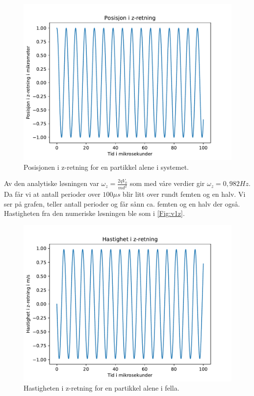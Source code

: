 \documentclass[reprint,english,notitlepage, nofootinbib]{revtex4-1}  %
\begin{document}
\begin{figure}[H]
	\centering 
	\includegraphics[scale=0.4]{../pythonplots/r1z.pdf}
	\caption{Posisjonen i z-retning for en partikkel alene i systemet.}
	\label{Fig:r1z}
\end{figure}
Av den analytiske løsningen var $\omega_z=\frac{2qV_0}{md^2}$ som med våre verdier gir $\omega_z=0,982Hz$. Da får vi at antall perioder over $100 \mu s$ blir litt over rundt femten og en halv. Vi ser på grafen, teller antall perioder og får sånn ca. femten og en halv der også.
Hastigheten fra den numeriske løsningen ble som i \autoref{Fig:v1z}.
\begin{figure}[H]
	\centering 
	\includegraphics[scale=0.4]{../pythonplots/vz.pdf}
	\caption{Hastigheten i z-retning for en partikkel alene i fella.}
	\label{Fig:v1z}
\end{figure}
\end{document}
